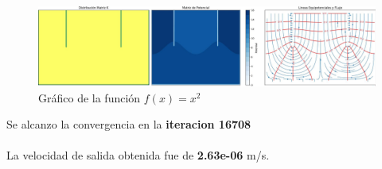 \begin{figure}[H]
    \centering
    \includegraphics[width=1\textwidth]{GRAFICOS/laplace_caso_ejemplo_doble.jpg}
    \caption{Gráfico de la función $f(x) = x^2$}
    \label{fig:caso_ejemplo}
\end{figure}

Se alcanzo la convergencia en la \textbf{iteracion 16708}
\\ \\
La velocidad de salida obtenida fue de \textbf{2.63e-06} m/s.